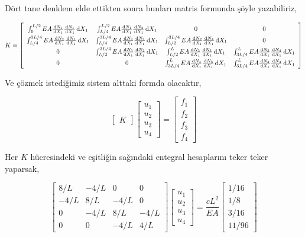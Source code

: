 \documentclass[12pt,fleqn]{article}\usepackage{../../common}
\begin{document}
Dört tane denklem elde ettikten sonra bunları matris formunda şöyle yazabiliriz,

$$
\renewcommand*{\arraystretch}{1.5}
K = \left[\begin{array}{cccc}
  \int_{0}^{L/2} EA \frac{\ud N_1}{\ud X_1} \frac{\ud N_1}{\ud X_1} \ud X_1 &
  \int_{L/4}^{L/2} EA \frac{\ud N_1}{\ud X_1} \frac{\ud N_2}{\ud X_1} \ud X_1 &
  0 &
  0 \\
  \int_{L/4}^{3L/4} EA \frac{\ud N_2}{\ud X_1} \frac{\ud N_1}{\ud X_1} \ud X_1 &
  \int_{L/4}^{3L/4} EA \frac{\ud N_2}{\ud X_1} \frac{\ud N_2}{\ud X_1} \ud X_1 &
  \int_{L/2}^{3L/4} EA \frac{\ud N_2}{\ud X_1} \frac{\ud N_3}{\ud X_1} \ud X_1 &
  0 \\
  0 &
  \int_{L/2}^{3L/4} EA \frac{\ud N_3}{\ud X_1} \frac{\ud N_2}{\ud X_1} \ud X_1 &
  \int_{L/2}^{L} EA \frac{\ud N_3}{\ud X_1} \frac{\ud N_3}{\ud X_1} \ud X_1  &
  \int_{3L/4}^{L} EA \frac{\ud N_3}{\ud X_1} \frac{\ud N_4}{\ud X_1} \ud X_1 \\
  0 &
  0 &
  \int_{3L/4}^{L} EA \frac{\ud N_4}{\ud X_1} \frac{\ud N_3}{\ud X_1} \ud X_1 &
  \int_{3L/4}^{L} EA \frac{\ud N_4}{\ud X_1} \frac{\ud N_4}{\ud X_1} \ud X_1
\end{array}\right]
$$

Ve çözmek istediğimiz sistem alttaki formda olacaktır,

$$
\left[\begin{array}{c}
K
\end{array}\right]
\left[\begin{array}{c}
u_1 \\ u_2 \\ u_3 \\ u_4 
\end{array}\right] = 
\left[\begin{array}{c}
f_1 \\ f_2 \\ f_3 \\ f_4 
\end{array}\right] 
$$

Her $K$ hücresindeki ve eşitliğin sağındaki entegral hesaplarını teker teker
yaparsak, 

$$
\left[\begin{array}{cccc}
8/L  & -4/L  & 0    & 0    \\
-4/L &  8/L  & -4/L & 0    \\
0    &  -4/L & 8/L  & -4/L \\
0    &  0    & -4/L & 4/L
\end{array}\right]
\left[\begin{array}{c}
u_1 \\ u_2 \\ u_3 \\ u_4 
\end{array}\right] =
\frac{cL^2}{EA}
\left[\begin{array}{c}
1/16 \\ 1/8 \\ 3/16 \\ 11/96
\end{array}\right] 
$$
\end{document}
